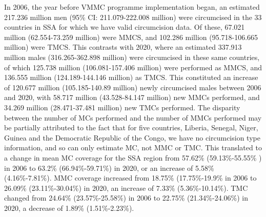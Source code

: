 \documentclass{article}
\begin{document}
In 2006, the year before VMMC programme implementation began, an estimated 217.236 million men (95\%
CI: 211.079-222.008 million) were circumcised in the 33 countries in SSA for which we have valid circumcision
data. 
Of these, 67.021 million (62.554-73.259 million) were MMCS, and 102.286 million (95.718-106.665
million) were TMCS. 
This contrasts with 2020, where an estimated 337.913 million males (316.265-362.898
million) were circumcised in these same countries, of which 125.738 million (106.081-157.406 million) were
performed as MMCS, and 136.555 million (124.189-144.146 million) as TMCS. 
This constituted an increase
of 120.677 million (105.185-140.89 million) newly circumcised males between 2006 and 2020, with 58.717
million (43.528-84.147 million) new MMCs performed, and 34.269 million (28.471-37.481 million) new TMCs performed. 
The disparity between the number of MCs performed and the number of MMCs performed may be partially attributed to the fact that for five countries, Liberia, Senegal, Niger, Guinea and the Democratic Republic of the Congo, we have no circumcision type information, and so can only estimate MC, not MMC or TMC. 
This translated to a change in mean MC coverage for the SSA region from 57.62\% (59.13\%-55.55\%
) in 2006 to 63.2\% (66.94\%-59.71\%) in 2020, or an increase of 5.58\% (4.16\%-7.81\%). 
MMC coverage increased from 18.75\% (17.75\%-19.9\%  in 2006 to 26.09\% (23.11\%-30.04\%) in 2020, an increase of 7.33\%
(5.36\%-10.14\%). 
TMC changed from 24.64\% (23.57\%-25.58\%) in 2006 to 22.75\% (21.34\%-24.06\%) in 2020, a decrease of 1.89\% (1.51\%-2.23\%).
\end{document}
